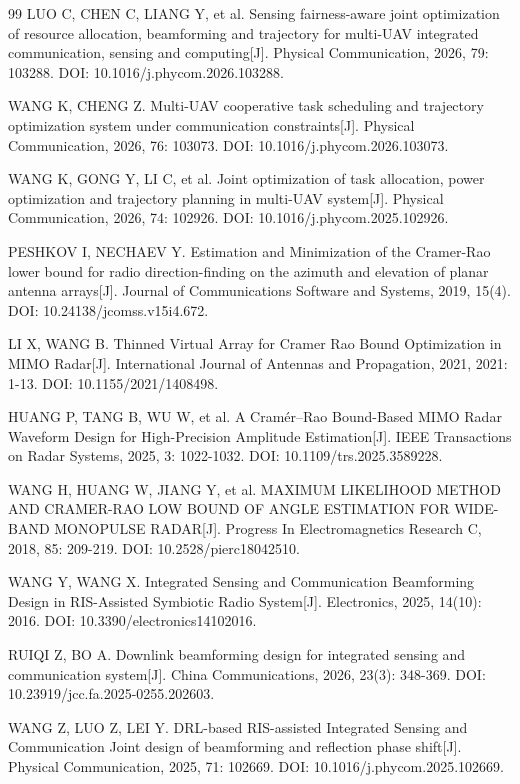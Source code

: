 \begin{thebibliography}{99}
 LUO C, CHEN C, LIANG Y, et al. Sensing fairness-aware joint optimization of resource allocation, beamforming and trajectory for multi-UAV integrated communication, sensing and computing[J]. Physical Communication, 2026, 79: 103288. DOI: 10.1016/j.phycom.2026.103288.

 WANG K, CHENG Z. Multi-UAV cooperative task scheduling and trajectory optimization system under communication constraints[J]. Physical Communication, 2026, 76: 103073. DOI: 10.1016/j.phycom.2026.103073.

 WANG K, GONG Y, LI C, et al. Joint optimization of task allocation, power optimization and trajectory planning in multi-UAV system[J]. Physical Communication, 2026, 74: 102926. DOI: 10.1016/j.phycom.2025.102926.

 PESHKOV I, NECHAEV Y. Estimation and Minimization of the Cramer-Rao lower bound for radio direction-finding on the azimuth and elevation of planar antenna arrays[J]. Journal of Communications Software and Systems, 2019, 15(4). DOI: 10.24138/jcomss.v15i4.672.

 LI X, WANG B. Thinned Virtual Array for Cramer Rao Bound Optimization in MIMO Radar[J]. International Journal of Antennas and Propagation, 2021, 2021: 1-13. DOI: 10.1155/2021/1408498.

 HUANG P, TANG B, WU W, et al. A Cramér–Rao Bound-Based MIMO Radar Waveform Design for High-Precision Amplitude Estimation[J]. IEEE Transactions on Radar Systems, 2025, 3: 1022-1032. DOI: 10.1109/trs.2025.3589228.

 WANG H, HUANG W, JIANG Y, et al. MAXIMUM LIKELIHOOD METHOD AND CRAMER-RAO LOW BOUND OF ANGLE ESTIMATION FOR WIDE-BAND MONOPULSE RADAR[J]. Progress In Electromagnetics Research C, 2018, 85: 209-219. DOI: 10.2528/pierc18042510.

 WANG Y, WANG X. Integrated Sensing and Communication Beamforming Design in RIS-Assisted Symbiotic Radio System[J]. Electronics, 2025, 14(10): 2016. DOI: 10.3390/electronics14102016.

 RUIQI Z, BO A. Downlink beamforming design for integrated sensing and communication system[J]. China Communications, 2026, 23(3): 348-369. DOI: 10.23919/jcc.fa.2025-0255.202603.

 WANG Z, LUO Z, LEI Y. DRL-based RIS-assisted Integrated Sensing and Communication Joint design of beamforming and reflection phase shift[J]. Physical Communication, 2025, 71: 102669. DOI: 10.1016/j.phycom.2025.102669.


\end{thebibliography}
